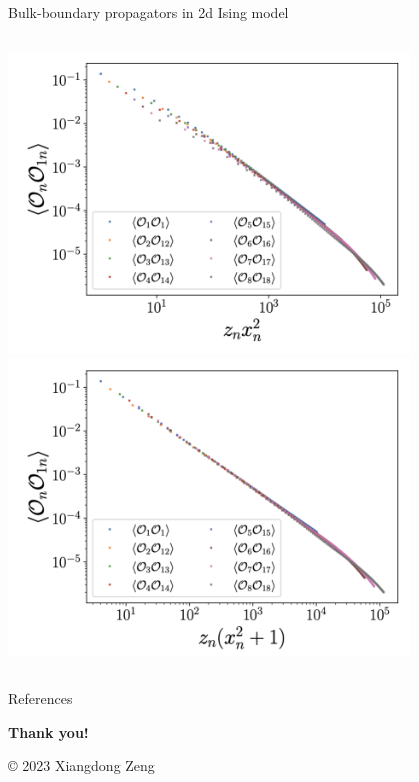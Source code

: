 \documentclass{fdubeamer}
\newcommand{\1}{\mathbb{1}}
\begin{document}
\begin{frame}{Bulk-boundary propagators in 2d Ising model}
\begin{columns}[T]
    \centering
    \includegraphics[width=0.8\textwidth]{images/holographic/bulk-boundary-propagator-1.png}
    \includegraphics[width=0.8\textwidth]{images/holographic/bulk-boundary-propagator-2.png}
    \vspace{-0.5em}

\end{columns}


\end{frame}

\begin{frame}{References}
  \tiny
  
\end{frame}

\begingroup
  \begin{frame}[plain]
    \vfill
    \begin{center}
      \color{white}
      \LARGE
      \textbf{Thank you!} \par
      \vspace{6em}
      \tiny
      \copyright{} 2023 Xiangdong Zeng
    \end{center}
    \vspace{-8em}
  \end{frame}
\endgroup
\end{document}
